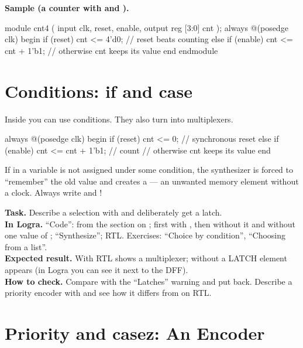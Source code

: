 \textbf{Sample (a counter with  and ).}
\begin{vcode}
module cnt4 (
    input            clk, reset, enable,
    output reg [3:0] cnt
);
    always @(posedge clk) begin
        if (reset)       cnt <= 4'd0;         // reset beats counting
        else if (enable) cnt <= cnt + 1'b1;   // otherwise cnt keeps its value
    end
endmodule
\end{vcode}


\section{Conditions: if and case}

Inside  you can use conditions. They also turn into
multiplexers.
\begin{vcode}
always @(posedge clk) begin
    if (reset)
        cnt <= 0;               // synchronous reset
    else if (enable)
        cnt <= cnt + 1'b1;      // count
    // otherwise cnt keeps its value
end
\end{vcode}

\begin{warnbox}[Latches]
If in  a variable is not assigned under some condition,
the synthesizer is forced to ``remember'' the old value and creates a ---
an unwanted memory element without a clock. Always write  and
!
\end{warnbox}

\begin{diybox}
\textbf{Task.} Describe a selection with  and deliberately get a latch.\\
\textbf{In Logra.} ``Code'':  from the section on ; first with , then without it and without one value of ; ``Synthesize''; RTL. Exercises: ``Choice by condition'', ``Choosing from a list''.\\
\textbf{Expected result.} With  RTL shows a multiplexer; without  a LATCH element appears (in Logra you can see it next to the DFF).\\
\textbf{How to check.} Compare with the ``Latches'' warning and put  back.  Describe a priority encoder with  and see how it differs from  on RTL.
\end{diybox}

\section{Priority and casez: An Encoder}
\label{sec:v-prio}

